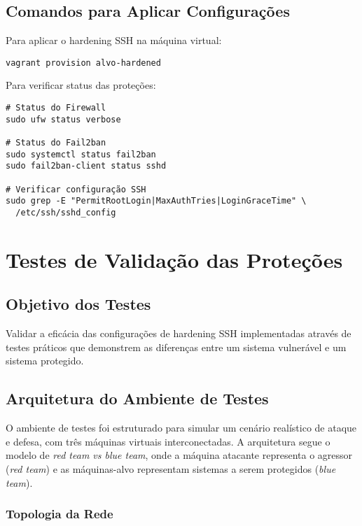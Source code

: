 \documentclass[12pt]{article}
\begin{document}
\subsection{Comandos para Aplicar Configurações}

Para aplicar o hardening SSH na máquina virtual:
\begin{verbatim}
vagrant provision alvo-hardened
\end{verbatim}

Para verificar status das proteções:
\begin{verbatim}
# Status do Firewall
sudo ufw status verbose

# Status do Fail2ban
sudo systemctl status fail2ban
sudo fail2ban-client status sshd

# Verificar configuração SSH
sudo grep -E "PermitRootLogin|MaxAuthTries|LoginGraceTime" \
  /etc/ssh/sshd_config
\end{verbatim}

\section{Testes de Validação das Proteções}

\subsection{Objetivo dos Testes}

Validar a eficácia das configurações de hardening SSH implementadas através de testes práticos que demonstrem as diferenças entre um sistema vulnerável e um sistema protegido.

\subsection{Arquitetura do Ambiente de Testes}

O ambiente de testes foi estruturado para simular um cenário realístico de ataque e defesa, com três máquinas virtuais interconectadas. A arquitetura segue o modelo de \emph{red team vs blue team}, onde a máquina atacante representa o agressor (\emph{red team}) e as máquinas-alvo representam sistemas a serem protegidos (\emph{blue team}).

\subsubsection{Topologia da Rede}
\end{document}
